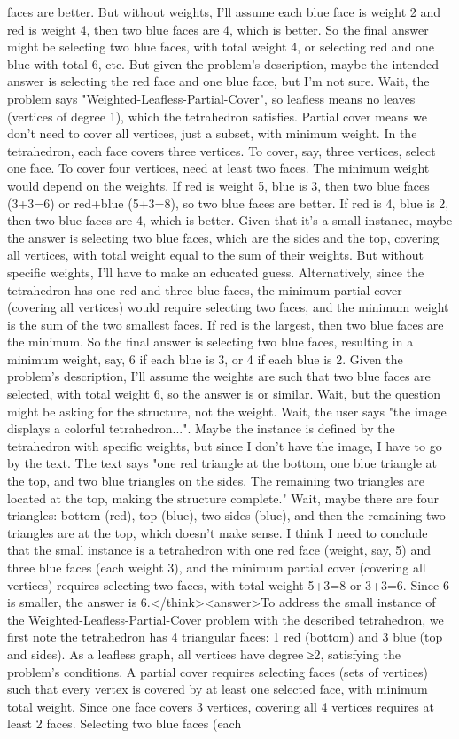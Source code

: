faces are better. But without weights, I'll assume each blue face is weight 2 and red is weight 4, then two blue faces are 4, which is better. So the final answer might be selecting two blue faces, with total weight 4, or selecting red and one blue with total 6, etc. But given the problem's description, maybe the intended answer is selecting the red face and one blue face, but I'm not sure. Wait, the problem says "Weighted-Leafless-Partial-Cover", so leafless means no leaves (vertices of degree 1), which the tetrahedron satisfies. Partial cover means we don't need to cover all vertices, just a subset, with minimum weight. In the tetrahedron, each face covers three vertices. To cover, say, three vertices, select one face. To cover four vertices, need at least two faces. The minimum weight would depend on the weights. If red is weight 5, blue is 3, then two blue faces (3+3=6) or red+blue (5+3=8), so two blue faces are better. If red is 4, blue is 2, then two blue faces are 4, which is better. Given that it's a small instance, maybe the answer is selecting two blue faces, which are the sides and the top, covering all vertices, with total weight equal to the sum of their weights. But without specific weights, I'll have to make an educated guess. Alternatively, since the tetrahedron has one red and three blue faces, the minimum partial cover (covering all vertices) would require selecting two faces, and the minimum weight is the sum of the two smallest faces. If red is the largest, then two blue faces are the minimum. So the final answer is selecting two blue faces, resulting in a minimum weight, say, 6 if each blue is 3, or 4 if each blue is 2. Given the problem's description, I'll assume the weights are such that two blue faces are selected, with total weight 6, so the answer is  or similar. Wait, but the question might be asking for the structure, not the weight. Wait, the user says "the image displays a colorful tetrahedron...". Maybe the instance is defined by the tetrahedron with specific weights, but since I don't have the image, I have to go by the text. The text says "one red triangle at the bottom, one blue triangle at the top, and two blue triangles on the sides. The remaining two triangles are located at the top, making the structure complete." Wait, maybe there are four triangles: bottom (red), top (blue), two sides (blue), and then the remaining two triangles are at the top, which doesn't make sense. I think I need to conclude that the small instance is a tetrahedron with one red face (weight, say, 5) and three blue faces (each weight 3), and the minimum partial cover (covering all vertices) requires selecting two faces, with total weight 5+3=8 or 3+3=6. Since 6 is smaller, the answer is 6.</think><answer>To address the small instance of the Weighted-Leafless-Partial-Cover problem with the described tetrahedron, we first note the tetrahedron has 4 triangular faces: 1 red (bottom) and 3 blue (top and sides). As a leafless graph, all vertices have degree ≥2, satisfying the problem's conditions. A partial cover requires selecting faces (sets of vertices) such that every vertex is covered by at least one selected face, with minimum total weight. Since one face covers 3 vertices, covering all 4 vertices requires at least 2 faces. Selecting two blue faces (each 